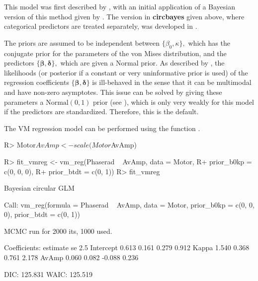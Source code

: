 \documentclass{article}
\newcommand{\code}[1]{\texttt{\detokenize{#1}}}
\newcommand{\pkg}[1]{\textbf{#1}}
\newenvironment{CodeChunk}{}{}
\begin{document}
This model was first described by \citet{fisher1992regression}, with an
initial application of a Bayesian version of this method given by
\citet{gill2010}. The version in \pkg{circbayes} given above, where
categorical predictors are treated separately, was developed in
\citet{mulder2017bayesian}.

The priors are assumed to be independent between
\(\{\beta_0, \kappa\},\) which has the conjugate prior for the
parameters of the von Mises distribution, and the predictors
\(\{\boldsymbol{\beta}, \boldsymbol{\delta}\},\) which are given a
Normal prior. As described by \citet{gill2010}, the likelihoods (or
posterior if a constant or very uninformative prior is used) of the
regression coefficients \(\{\boldsymbol{\beta}, \boldsymbol{\delta}\}\)
is ill-behaved in the sense that it can be multimodal and have non-zero
asymptotes. This issue can be solved by giving these parameters a
\(\text{Normal}(0, 1)\) prior (see \citet{mulder2017bayesian}), which is
only very weakly for this model if the predictors are standardized.
Therefore, this is the default.

The VM regression model can be performed using the function
\code{vm_reg}.

\begin{CodeChunk}
	
	\begin{CodeInput}
		R> Motor$AvAmp <- scale(Motor$AvAmp)
	\end{CodeInput}
\end{CodeChunk}

\begin{CodeChunk}
	
	\begin{CodeInput}
		R> fit_vmreg <- vm_reg(Phaserad ~ AvAmp, data = Motor, 
		R+                     prior_b0kp = c(0, 0, 0),
		R+                     prior_btdt = c(0, 1))
		R> fit_vmreg
	\end{CodeInput}
	
	\begin{CodeOutput}
		Bayesian circular GLM 
		
		Call:
		vm_reg(formula = Phaserad ~ AvAmp, data = Motor, prior_b0kp = c(0, 
		0, 0), prior_btdt = c(0, 1))
		
		MCMC run for 2000 its, 1000 used. 
		
		Coefficients:
		estimate    se   2.5%
		Intercept    0.613 0.161  0.279 0.912
		Kappa        1.540 0.368  0.761 2.178
		AvAmp        0.060 0.082 -0.088 0.236
		
		DIC:  125.831 
		WAIC: 125.519 
	\end{CodeOutput}
\end{CodeChunk}
\end{document}
